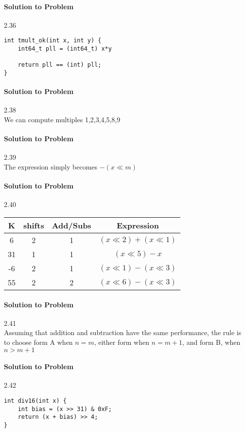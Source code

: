 \documentclass{report}
\begin{document}
\paragraph{Solution to Problem} 2.36 \\


\begin{lstlisting}
int tmult_ok(int x, int y) {
    int64_t pll = (int64_t) x*y
    
    return pll == (int) pll;
}
\end{lstlisting}

\paragraph{Solution to Problem} 2.38 \\
We can compute multiples 1,2,3,4,5,8,9

\paragraph{Solution to Problem} 2.39 \\
The expression simply becomes $-(x\ll m)$

\paragraph{Solution to Problem} 2.40 \\
\begin{center}
\begin{tabular}{ |c|c|c|c| } 
\hline
K & shifts & Add/Subs & Expression \\ \hline
6 & 2 & 1 & $(x \ll 2) + (x \ll 1)$ \\
31 & 1 & 1 & $(x \ll 5) - x$  \\
-6 & 2 & 1 & $(x \ll 1) - (x \ll 3)$  \\
55 & 2 & 2 & $(x \ll 6) - (x \ll 3)$  \\ \hline
\end{tabular}
\end{center}

\paragraph{Solution to Problem} 2.41 \\
Assuming that addition and subtraction have the same performance, the rule is to choose form A when $n = m$, either form when $n = m + 1$, and form B, when $n > m + 1$

\paragraph{Solution to Problem} 2.42 \\
\begin{lstlisting}
int div16(int x) {
    int bias = (x >> 31) & 0xF;
    return (x + bias) >> 4;
}
\end{lstlisting}
\end{document}
